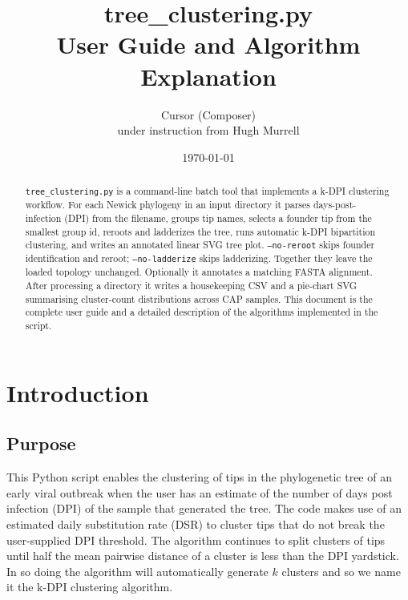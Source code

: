 \documentclass[11pt,a4paper]{article}
\title{%
  \textbf{tree\_clustering.py}\\[0.4em]
  \large User Guide and Algorithm Explanation
}
\author{Cursor (Composer)\\[0.25em]
\large under instruction from Hugh Murrell}
\date{\today}
\begin{document}
\maketitle

\begin{abstract}
\texttt{tree\_clustering.py} is a command-line batch tool that implements a
k-DPI clustering workflow.
For each Newick phylogeny in an input directory it parses days-post-infection
(DPI) from the filename, groups tip names, selects a founder tip from the
smallest group id, reroots and ladderizes the tree, runs automatic k-DPI
bipartition clustering, and writes an annotated linear SVG tree plot.
\texttt{--no-reroot} skips founder identification and reroot;
\texttt{--no-ladderize} skips ladderizing. Together they leave the loaded
topology unchanged.
Optionally it annotates a matching FASTA alignment.
After processing a directory it writes a housekeeping CSV and a pie-chart SVG
summarising cluster-count distributions across CAP samples.
This document is the complete user guide and a detailed description of the
algorithms implemented in the script.
\end{abstract}

\tableofcontents
\newpage

\section{Introduction}

\subsection{Purpose}
This Python script enables the clustering of tips in the phylogenetic tree of
an early viral outbreak when the user has an estimate of the number of days
post infection (DPI) of the sample that generated the tree.
The code makes use of an estimated daily substitution rate (DSR) to cluster
tips that do not break the user-supplied DPI threshold.
The algorithm continues to split clusters of tips until half the mean pairwise
distance of a cluster is less than the DPI yardstick.
In so doing the algorithm will automatically generate $k$ clusters and so we
name it the k-DPI clustering algorithm.
\end{document}

